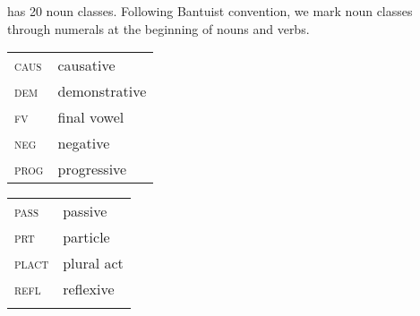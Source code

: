 \documentclass[output=paper]{langsci/lanmgscibook}
\begin{document}
 has 20 noun classes. Following Bantuist convention, we mark noun classes through numerals at the beginning of nouns and verbs. 

\begin{tabularx}{.45\textwidth}{lX}
\textsc{caus} & causative  \\
\textsc{dem} & demonstrative  \\
\textsc{fv} & final vowel \\
\textsc{neg} & negative    \\
\textsc{prog} & progressive  \\
\end{tabularx}
\begin{tabularx}{.45\textwidth}{lX}
\textsc{pass} & passive  \\
\textsc{prt} & particle    \\
\textsc{plact} & plural act  \\
\textsc{refl} & reflexive \\
\\
\end{tabularx}


\printbibliography[heading=subbibliography,notkeyword=this]
\end{document}
